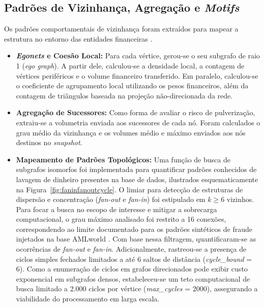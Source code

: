 \documentclass[titlepage,a4paper,oneside,onecolumn,12pt]{report}
\begin{document}
\subsection{Padrões de Vizinhança, Agregação e \textit{Motifs}}

Os padrões comportamentais de vizinhança foram extraídos para mapear a estrutura no entorno das entidades financeiras \cite{dong2025spacegnn}.

\begin{itemize}
    \item \textbf{\textit{Egonets} e Coesão Local:} Para cada vértice, gerou-se o seu subgrafo de raio 1 (\textit{ego graph}). A partir dele, calculou-se a densidade local, a contagem de vértices periféricos e o volume financeiro transferido. Em paralelo, calculou-se o coeficiente de agrupamento local utilizando os pesos financeiros, além da contagem de triângulos baseada na projeção não-direcionada da rede.
    
    \item \textbf{Agregação de Sucessores:} Como forma de avaliar o risco de pulverização, extraiu-se a volumetria enviada aos sucessores de cada nó. Foram calculados o grau médio da vizinhança e os volumes médio e máximo enviados aos nós destinos no \textit{snapshot}.
    
    \item \textbf{Mapeamento de Padrões Topológicos:} Uma função de busca de subgrafos isomorfos foi implementada para quantificar padrões conhecidos de lavagem de dinheiro presentes na base de dados, ilustrados esquematicamente na Figura~\ref{fig:faninfanoutcycle}. O limiar para detecção de estruturas de dispersão e concentração (\textit{fan-out} e \textit{fan-in}) foi estipulado em $k \ge 6$ vizinhos. Para focar a busca no escopo de interesse e mitigar a sobrecarga computacional, o grau máximo analisado foi restrito a 16 conexões, correspondendo ao limite documentado para os padrões sintéticos de fraude injetados na base AMLworld \cite{altman2023realistic}. Com base nessa filtragem, quantificaram-se as ocorrências de \textit{fan-out} e \textit{fan-in}. Adicionalmente, rastreou-se a presença de ciclos simples fechados limitados a até 6 saltos de distância (\textit{cycle\_bound} = 6). Como a enumeração de ciclos em grafos direcionados pode exibir custo exponencial em subgrafos densos, estabeleceu-se um teto computacional de busca limitado a 2.000 ciclos por vértice (\textit{max\_cycles} = 2000), assegurando a viabilidade do processamento em larga escala.
\end{itemize}
\end{document}
